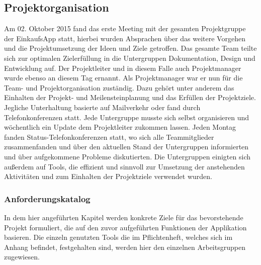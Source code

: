 \documentclass[12pt,a4paper]{article}
\begin{document}
\subsection{Projektorganisation}
Am 02. Oktober 2015 fand das erste Meeting mit der gesamten Projektgruppe der EinkaufsApp statt, hierbei wurden Absprachen über das weitere Vorgehen und die Projektumsetzung der Ideen und Ziele getroffen.
Das gesamte Team teilte sich zur optimalen Zielerfüllung in die Untergruppen Dokumentation, Design und Entwicklung auf.
Der Projektleiter und in diesem Falle auch Projektmanager wurde ebenso an diesem Tag ernannt.
Als Projektmanager war er nun für die Team- und Projektorganisation zuständig. Dazu gehört unter anderem das Einhalten der Projekt- und Meilensteinplanung und das Erfüllen der Projektziele.
Jegliche Unterhaltung basierte auf Mailverkehr oder fand durch Telefonkonferenzen statt. Jede Untergruppe musste sich selbst organisieren und wöchentlich ein Update dem Projektleiter zukommen lassen. Jeden Montag fanden Status-Telefonkonferenzen statt, wo sich alle Teammitglieder zusammenfanden und über den aktuellen Stand der Untergruppen informierten und über aufgekommene Probleme diskutierten. 
Die Untergruppen einigten sich außerdem auf Tools, die effizient und sinnvoll zur Umsetzung der anstehenden Aktivitäten und zum Einhalten der Projektziele verwendet wurden. 

\newpage
\subsubsection{Anforderungskatalog}
In dem hier angeführten Kapitel werden konkrete Ziele für das bevorstehende Projekt formuliert, die auf den zuvor aufgeführten Funktionen der Applikation basieren.
Die einzeln genutzten Tools die im Pflichtenheft, welches sich im Anhang befindet, festgehalten sind, werden hier den einzelnen Arbeitsgruppen zugewiesen.
\\
\end{document}
